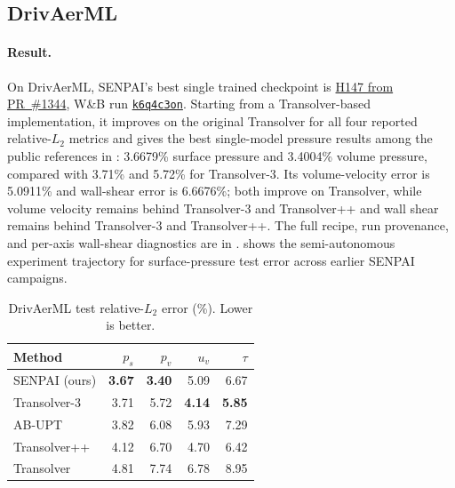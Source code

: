 \documentclass{article}
\newcommand{\best}[1]{\textbf{#1}}
\begin{document}
\subsection{DrivAerML}

\paragraph{Result.}
On DrivAerML, SENPAI's best single trained checkpoint is \href{https://github.com/morganmcg1/DrivAerML/pull/1344}{H147 from PR~\#1344}, W\&B run \href{https://wandb.ai/wandb-applied-ai-team/senpai-v1-drivaerml-ddp8/runs/k6q4c3on}{\texttt{k6q4c3on}}. Starting from a Transolver-based implementation, it improves on the original Transolver for all four reported relative-$L_2$ metrics and gives the best single-model pressure results among the public references in : 3.6679\% surface pressure and 3.4004\% volume pressure, compared with 3.71\% and 5.72\% for Transolver-3. Its volume-velocity error is 5.0911\% and wall-shear error is 6.6676\%; both improve on Transolver, while volume velocity remains behind Transolver-3 and Transolver++ and wall shear remains behind Transolver-3 and Transolver++. The full recipe, run provenance, and per-axis wall-shear diagnostics are in .  shows the semi-autonomous experiment trajectory for surface-pressure test error across earlier SENPAI campaigns.

\begin{table}[t]
  \caption{DrivAerML test relative-$L_2$ error (\%). Lower is better.}
  \label{tab:drivaerml}
  \centering
  \small
  \setlength{\tabcolsep}{2pt}
  \begin{tabular}{@{}lrrrr@{}}
    \toprule
    Method & $p_s$ & $p_v$ & $u_v$ & $\tau$ \\
    \midrule
    SENPAI (ours) & \best{3.67} & \best{3.40} & 5.09 & 6.67 \\
    Transolver-3 \citep{zhou2026transolver3} & 3.71 & 5.72 & \best{4.14} & \best{5.85} \\
    AB-UPT \citep{alkin2025abupt} & 3.82 & 6.08 & 5.93 & 7.29 \\
    Transolver++ \citep{luo2025transolverplusplus} & 4.12 & 6.70 & 4.70 & 6.42 \\
    Transolver \citep{wu2024transolver} & 4.81 & 7.74 & 6.78 & 8.95 \\
    \bottomrule
  \end{tabular}
\end{table}
\end{document}
